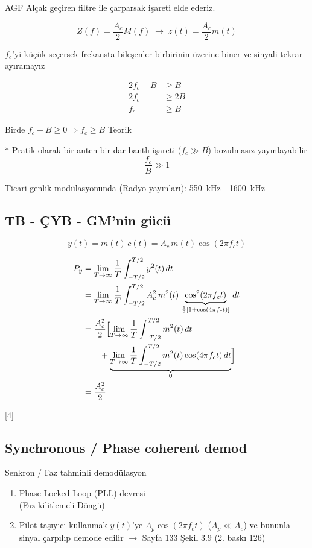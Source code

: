 \documentclass[11pt,a4paper]{article}
\begin{document}
AGF Alçak geçiren filtre ile çarparsak işareti elde ederiz.

\[ Z(f) = \frac{A_c}{2}M(f) \;\to\; z(t) = \frac{A_c}{2}m(t) \]

$f_c$'yi küçük seçersek frekansta bileşenler birbirinin üzerine biner ve sinyali tekrar ayıramayız

\begin{align*}
2f_c - B &\geq B\\
2f_c &\geq 2B\\
f_c &\geq B
\end{align*}

Birde $f_c - B \geq 0 \Rightarrow f_c \geq B$ \hfill Teorik

$\ast$ Pratik olarak bir anten bir dar bantlı işareti ($f_c \gg B$) bozulmasız yayınlayabilir
\[ \frac{f_c}{B} \gg 1 \]

Ticari genlik modülasyonunda (Radyo yayınları): \qty{550}{\kilo\hertz} - \qty{1600}{\kilo\hertz}


\subsection{TB - ÇYB - GM'nin gücü}
\[ y(t) = m(t)\,c(t) = A_c\, m(t)\cos(2\pi f_c t) \]

\begin{align*}
P_y &= \lim_{T\to\infty}\frac1T\int_{-T/2}^{T/2} y^2(t)\,dt\\
 &= \lim_{T\to\infty}\frac1T\int_{-T/2}^{T/2} A_c^2\, m^2(t)\,\underbrace{\cos^2(2\pi f_c t)}_{\frac12[1+\cos(4\pi f_c t)]}\,dt\\
 &= \frac{A_c^2}{2}\Bigl[\lim_{T\to\infty}\frac1T\int_{-T/2}^{T/2} m^2(t)\,dt\\
 &\qquad + \underbrace{\lim_{T\to\infty}\frac1T\int_{-T/2}^{T/2} m^2(t)\cos(4\pi f_c t)\,dt}_{0}\Bigr]\\
 &= \frac{A_c^2}{2}
\end{align*}


[4]

\subsection{Synchronous / Phase coherent demod}
Senkron / Faz tahminli demodülasyon
\begin{enumerate}
\item Phase Locked Loop (PLL) devresi \\ (Faz kilitlemeli Döngü)
\item Pilot taşıyıcı kullanmak \quad $y(t)$'ye $A_p\cos(2\pi f_c t)$ ($A_p \ll A_c$) ve bununla sinyal çarpılıp demode edilir \quad $\rightarrow$ Sayfa 133 Şekil 3.9 (2. baskı 126)
\end{enumerate}
\end{document}
